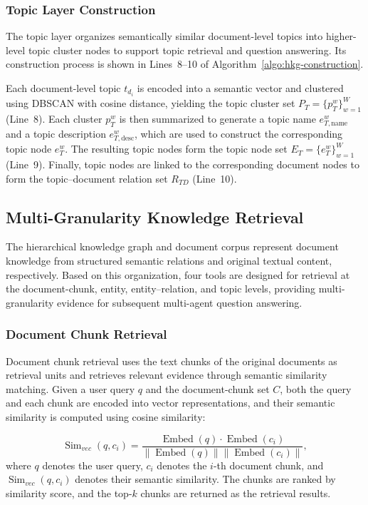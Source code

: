 \documentclass[preprint,12pt,authoryear]{elsarticle}
\begin{document}
\subsubsection{Topic Layer Construction}
\label{subsubsec:topic-layer}

The topic layer organizes semantically similar document-level topics into higher-level topic cluster nodes to support topic retrieval and question answering. Its construction process is shown in Lines~8--10 of Algorithm~\ref{algo:hkg-construction}.

Each document-level topic $t_{d_i}$ is encoded into a semantic vector and clustered using DBSCAN \citep{ester1996density} with cosine distance, yielding the topic cluster set $P_T=\{p_T^w\}_{w=1}^{W}$ (Line~8). Each cluster $p_T^w$ is then summarized to generate a topic name $e_{T,\mathrm{name}}^w$ and a topic description $e_{T,\mathrm{desc}}^w$, which are used to construct the corresponding topic node $e_T^w$. The resulting topic nodes form the topic node set $E_T=\{e_T^w\}_{w=1}^{W}$ (Line~9). Finally, topic nodes are linked to the corresponding document nodes to form the topic--document relation set $R_{TD}$ (Line~10).

\subsection{Multi-Granularity Knowledge Retrieval}
\label{subsec:multi-granularity-retrieval}
The hierarchical knowledge graph and document corpus represent document knowledge from structured semantic relations and original textual content, respectively. Based on this organization, four tools are designed for retrieval at the document-chunk, entity, entity--relation, and topic levels, providing multi-granularity evidence for subsequent multi-agent question answering.

\subsubsection{Document Chunk Retrieval}
Document chunk retrieval uses the text chunks of the original documents as retrieval units and retrieves relevant evidence through semantic similarity matching. Given a user query $q$ and the document-chunk set $C$, both the query and each chunk are encoded into vector representations, and their semantic similarity is computed using cosine similarity:

\begin{equation}
\operatorname{Sim}_{vec}(q,c_i)
=
\frac{
\operatorname{Embed}(q)\cdot\operatorname{Embed}(c_i)
}{
\left\|\operatorname{Embed}(q)\right\|
\left\|\operatorname{Embed}(c_i)\right\|
},
\label{eq:chunk_similarity}
\end{equation}
where $q$ denotes the user query, $c_i$ denotes the $i$-th document chunk, and $\operatorname{Sim}_{vec}(q,c_i)$ denotes their semantic similarity. The chunks are ranked by similarity score, and the top-$k$ chunks are returned as the retrieval results.
\end{document}

